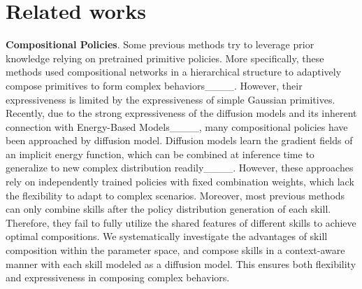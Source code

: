 \section{Related works}
\vspace{-7pt}
\label{rel_work}

\textbf{Compositional Policies}.
Some previous methods try to leverage prior knowledge relying on pretrained primitive policies. More specifically, these methods used compositional networks in a hierarchical structure to adaptively compose primitives to form complex behaviors____. However, their expressiveness is limited by the expressiveness of simple Gaussian primitives. 
Recently, due to the strong expressiveness of the diffusion models and its inherent connection with Energy-Based Models____, many compositional policies have been approached by diffusion model. Diffusion models learn the gradient fields of an implicit energy function, which can be combined at inference time to generalize to new complex distribution readily____. However, these approaches rely on independently trained policies with fixed combination weights, which lack the flexibility to adapt to complex scenarios. Moreover, most previous methods can only combine skills after the policy distribution generation of each skill. Therefore, they fail to fully utilize the shared features of different skills to achieve optimal compositions. 
We systematically investigate the advantages of skill composition 
within the parameter space, and compose skills in a context-aware manner with each skill modeled as a diffusion model. This ensures both flexibility and expressiveness in composing complex behaviors.

